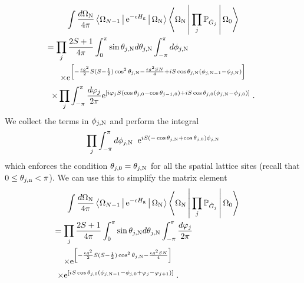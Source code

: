 \documentclass[aps,prl,reprint,twocolumn,superscriptaddress,floatfix,nofootinbib]{revtex4-1}
\begin{document}
\begin{multline}
	\int \frac{d \Omega_{\rm N}}{4 \pi} \Braket{\Omega_{N-1}| {\rm e}^{-\epsilon H_{\rm g}} | \Omega_{\rm N}} \Braket{\Omega_{\rm N}| \prod_j \mathbb{P}_{\hat{G}_j} | \Omega_0} \\
	\hspace{-3cm}
	= \prod_j \frac{2S+1}{4 \pi} \int_0^\pi \sin \theta_{j,{\rm N}} d\theta_{j,{\rm N}} \int_{-\pi}^{\pi} d \phi_{j,{\rm N}} \nonumber \\
	\times {\rm e}^{\left[ -\frac{\epsilon g^2}{2} S (S-\frac{1}{2}) \cos^2 \theta_{j,{\rm N}} - \frac{\epsilon g^2 S N}{4} + i S \cos \theta_{j,{\rm N}} (\phi_{j, {\rm N-1}} - \phi_{j, {\rm N}})\right] } \nonumber \\
	\times \prod_j \int_{-\pi}^{\pi} \frac{d \varphi_j}{2 \pi} {\rm e}^{\left[ i \varphi_j S (\cos \theta_{j, 0} - \cos \theta_{j-1, 0}) + i S \cos \theta_{j,0} (\phi_{j,{\rm N}} - \phi_{j, 0}) \right]} \;.
\end{multline}
We collect the terms in $\phi_{j,{\rm N}}$ and perform the integral
\begin{multline}
	\prod_j \int_{-\pi}^{\pi} d\phi_{j,{\rm N}} \hspace{0.2cm} {\rm e}^{i S (-\cos \theta_{j,{\rm N}} + \cos \theta_{j, 0}) \phi_{j,{\rm N}}} \nonumber 
\end{multline}
which enforces the condition $\theta_{j, 0} = \theta_{j, {\rm N}}$ for all the spatial lattice sites (recall that $0 \leq \theta_{j,{\rm n}} < \pi$). We can use this to simplify the matrix element
\begin{multline}
	\int \frac{d \Omega_{\rm N}}{4 \pi} \Braket{\Omega_{N-1}| {\rm e}^{-\epsilon H_{\rm g}} | \Omega_{\rm N}} \Braket{\Omega_{\rm N}| \prod_j \mathbb{P}_{\hat{G}_j} | \Omega_0} \\
	\hspace{-2.5cm}
	= \prod_j \frac{2S+1}{4 \pi} \int_0^\pi \sin \theta_{j,{\rm N}} d\theta_{j,{\rm N}} \int_{-\pi}^{\pi} \frac{d \varphi_j}{2 \pi} \\
	\hspace{-3cm}
	\times {\rm e}^{\left[ -\frac{\epsilon g^2}{2} S (S-\frac{1}{2}) \cos^2 \theta_{j,{\rm N}} - \frac{\epsilon g^2 S N}{4} \right]} \\
	\hspace{-3cm}
	\times {\rm e}^{\left[i S \cos \theta_{j,0} (\phi_{j,{\rm N-1}} - \phi_{j,0} + \varphi_j - \varphi_{j+1}) \right]} \;. \nonumber
\end{multline}
\end{document}
